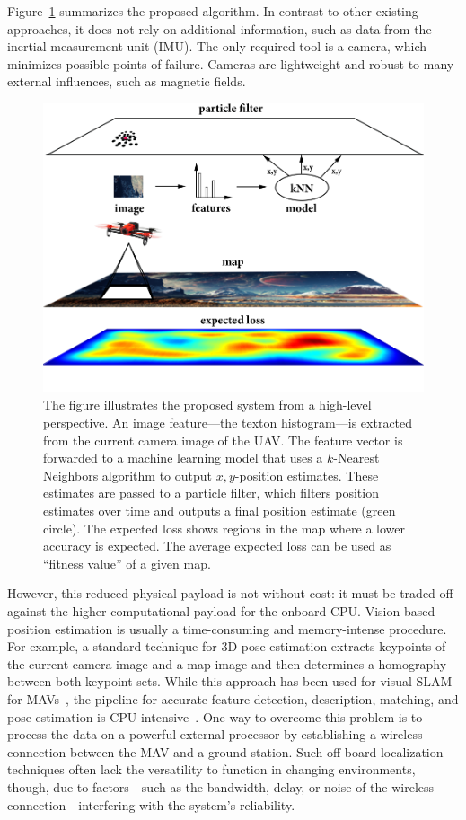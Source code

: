 \documentclass{report}
\begin{document}
Figure~\ref{fig:highleveloverview} summarizes the proposed
algorithm. In contrast to other existing approaches, it does not rely
on additional information, such as data from the inertial measurement
unit (IMU). The only required tool is a camera, which minimizes
possible points of failure. Cameras are lightweight and robust to many
external influences, such as magnetic fields.

\begin{figure}[h!]
\begin{center}
\includegraphics[width=0.7\columnwidth]{nutshell}
\caption{{\label{fig:highleveloverview} The figure illustrates the
    proposed system from a high-level perspective. An image
    feature---the texton histogram---is extracted from the current
    camera image of the UAV. The feature vector is forwarded to a
    machine learning model that uses a $k$-Nearest Neighbors algorithm
    to output $x,y$-position estimates. These estimates are passed to
    a particle filter, which filters position estimates over time and
    outputs a final position estimate (green circle). The expected
    loss shows regions in the map where a lower accuracy is
    expected. The average expected loss can be used as ``fitness
    value'' of a given map.%
  }}
\end{center}
\end{figure}

However, this reduced physical payload is not without cost: it must be
traded off against the higher computational payload for the onboard
CPU. Vision-based position estimation is usually a time-consuming and
memory-intense procedure.  For example, a standard technique for 3D
pose estimation extracts keypoints of the current camera image and a
map image and then determines a homography between both keypoint
sets. While this approach has been used for visual SLAM for
MAVs~\cite{blosch2010vision}, the pipeline for accurate feature
detection, description, matching, and pose estimation is
CPU-intensive~\cite{kendall2015posenet}.  One way to overcome
this problem is to process the data on a powerful external processor
by establishing a wireless connection between the MAV and a ground
station. Such off-board localization techniques often lack the
versatility to function in changing environments, though, due to
factors---such as the bandwidth, delay, or noise of the wireless
connection---interfering with the system's reliability.
\end{document}
